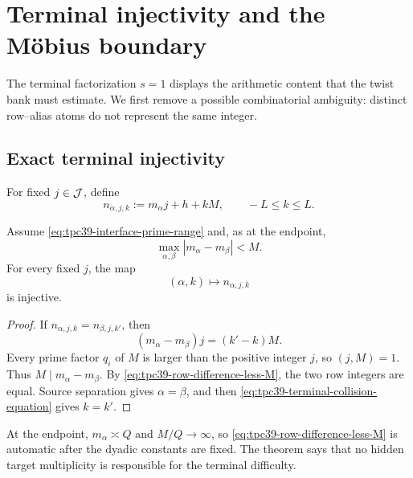 \section{Terminal injectivity and the M\"obius boundary}
\label{sec:tpc39-terminal}

The terminal factorization \(s=1\) displays the arithmetic content that
the twist bank must estimate.  We first remove a possible combinatorial
ambiguity: distinct row--alias atoms do not represent the same integer.

\subsection{Exact terminal injectivity}

For fixed \(j\in\mathcal J\), define
\begin{equation}
 n_{\alpha,j,k}
 :=m_\alpha j+h+kM,
 \qquad -L\le k\le L.
 \label{eq:tpc39-terminal-target}
\end{equation}

\begin{theorem}
\label{thm:tpc39-terminal-injectivity}
Assume \eqref{eq:tpc39-interface-prime-range} and, as at the endpoint,
\begin{equation}
 \max_{\alpha,\beta}|m_\alpha-m_\beta|<M.
 \label{eq:tpc39-row-difference-less-M}
\end{equation}
For every fixed \(j\), the map
\begin{equation}
 (\alpha,k)\longmapsto n_{\alpha,j,k}
 \label{eq:tpc39-terminal-injective-map}
\end{equation}
is injective.
\end{theorem}

\begin{proof}
If \(n_{\alpha,j,k}=n_{\beta,j,k'}\), then
\begin{equation}
 (m_\alpha-m_\beta)j=(k'-k)M.
 \label{eq:tpc39-terminal-collision-equation}
\end{equation}
Every prime factor \(q_i\) of \(M\) is larger than the positive integer
\(j\), so \((j,M)=1\).  Thus
\(M\mid m_\alpha-m_\beta\).  By
\eqref{eq:tpc39-row-difference-less-M}, the two row integers are equal.
Source separation gives \(\alpha=\beta\), and then
\eqref{eq:tpc39-terminal-collision-equation} gives \(k=k'\).
\end{proof}

At the endpoint, \(m_\alpha\asymp Q\) and \(M/Q\to\infty\), so
\eqref{eq:tpc39-row-difference-less-M} is automatic after the dyadic
constants are fixed.  The theorem says that no hidden target multiplicity
is responsible for the terminal difficulty.


